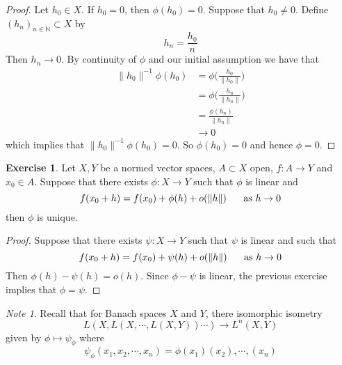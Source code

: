 \documentclass[12pt]{amsart}
\theoremstyle{definition}
\theoremstyle{remark}
\newtheorem{note}[remark]{Note}
\theoremstyle{definition}
\newtheorem{ex}[definition]{Exercise}
\newcommand{\N}{\mathbb{N}}
\begin{document}
	\begin{proof}
	Let $h_0 \in X$. If $h_0 = 0$, then $\phi(h_0) = 0$. Suppose that $h_0 \neq 0$. Define $(h_n)_{n \in \N} \subset X$ by $$h_n = \frac{h_0}{n}$$ Then $h_n \rightarrow 0$. By continuity of $\phi$ and our initial assumption we have that 
	\begin{align*}
	\| h_0 \|^{-1} \phi ( h_0 ) 
	&= \phi \bigg( \frac{h_0}{\| h_0 \|} \bigg) \\
	&= \phi \bigg( \frac{h_n}{\| h_n \|} \bigg) \\
	&= \frac{\phi(h_n)}{\| h_n \|} \\
	& \rightarrow 0
	\end{align*}
	which implies that $\| h_0 \|^{-1}\phi ( h_0 ) = 0$. So $\phi(h_0) = 0$ and hence $\phi = 0$.
	\end{proof}
	
	\begin{ex}
	Let $X, Y$ be a normed vector spaces, $A \subset X$ open, $f:A \rightarrow Y$ and $x_0 \in A$. Suppose that there exists $\phi: X \rightarrow Y$ such that $\phi$ is linear and $$f(x_0 + h) = f(x_0) + \phi(h) + o(\|h\| ) \hspace{.5cm} \text{ as } h \rightarrow 0$$ then $\phi$ is unique. 
	\end{ex}
	
	\begin{proof}
	Suppose that there exists $\psi : X \rightarrow Y$ such that $\psi$ is linear and such that
	$$f(x_0 + h) = f(x_0) + \psi(h) + o(\|h\| ) \hspace{.5cm} \text{ as } h \rightarrow 0$$ 
	Then $\phi(h) - \psi(h) = o(h)$. Since $\phi - \psi$ is linear, the previous exercise implies that $\phi = \psi$.
	\end{proof}
	
	\begin{note}
	Recall that for Banach spaces $X$ and $Y$, there isomorphic isometry $$L(X, L(X, \cdots, L(X, Y)) \cdots) \rightarrow L^n(X, Y)$$ given by $\phi \mapsto \psi_{\phi}$ where $$\psi_{\phi}(x_1, x_2, \cdots, x_n) = \phi(x_1)(x_2),\cdots,(x_n)$$
	\end{note}	
	
\end{document}
